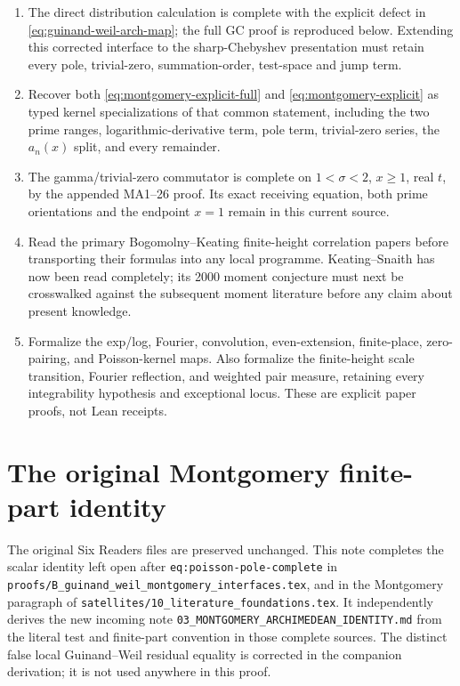 \begin{enumerate}
  \item The direct distribution calculation is complete with the explicit defect in \eqref{eq:guinand-weil-arch-map}; the full GC proof is reproduced below. Extending this corrected interface to the sharp-Chebyshev presentation must retain every pole, trivial-zero, summation-order, test-space and jump term.
  \item Recover both \eqref{eq:montgomery-explicit-full} and
  \eqref{eq:montgomery-explicit} as typed kernel specializations of that common statement,
  including the two prime ranges, logarithmic-derivative term, pole term, trivial-zero
  series, the $a_n(x)$ split, and every remainder.
  \item The gamma/trivial-zero commutator is complete on $1<\sigma<2$, $x\ge1$, real $t$, by the appended MA1--26 proof. Its exact receiving equation, both prime orientations and the endpoint $x=1$ remain in this current source.
  \item Read the primary Bogomolny--Keating finite-height correlation papers before
  transporting their formulas into any local programme.  Keating--Snaith has now been read
  completely; its 2000 moment conjecture must next be crosswalked against the subsequent
  moment literature before any claim about present knowledge.
  \item Formalize the exp/log, Fourier, convolution, even-extension, finite-place,
  zero-pairing, and Poisson-kernel maps.  Also formalize the finite-height scale transition,
  Fourier reflection, and weighted pair measure, retaining every integrability hypothesis and
  exceptional locus.  These are explicit paper proofs, not Lean receipts.
\end{enumerate}


\clearpage
\begingroup
\def\R{\mathbb R}
\def\C{\mathbb C}
\def\PF{\operatorname{PF}}
\def\dd{\,d}

\setcounter{equation}{0}
\renewcommand{\theequation}{A03MA.\arabic{equation}}
\section*{The original Montgomery finite-part identity}

\noindent The original Six Readers files are preserved unchanged. This note
completes the scalar identity left open after
\texttt{eq:poisson-pole-complete} in
\nolinkurl{proofs/B_guinand_weil_montgomery_interfaces.tex}, and in the
Montgomery paragraph of
\texttt{satellites/10\_literature\_foundations.tex}.
It independently derives the new incoming note
\texttt{03\_MONTGOMERY\_ARCHIMEDEAN\_IDENTITY.md} from the literal test and
finite-part convention in those complete sources. The distinct false local
Guinand--Weil residual equality is corrected in the companion derivation;
it is not used anywhere in this proof.

